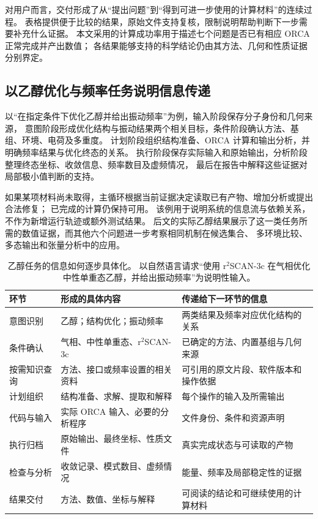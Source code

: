 \documentclass[UTF8,fontset=fandol,a4paper,11pt]{ctexart}
\begin{document}
对用户而言，交付形成了从“提出问题”到“得到可进一步使用的计算材料”的连续过程。%
表格提供便于比较的结果，原始文件支持复核，限制说明帮助判断下一步需要补充什么证据。%
本文采用的计算成功率用于描述七个问题是否已有相应 ORCA 正常完成并产出数值；%
各结果能够支持的科学结论仍由其方法、几何和性质证据分别界定。

\subsection{以乙醇优化与频率任务说明信息传递}
以“在指定条件下优化乙醇并给出振动频率”为例，输入阶段保存分子身份和几何来源，%
意图阶段形成优化结构与振动结果两个相关目标，条件阶段确认方法、基组、环境、电荷及多重度。%
计划阶段组织结构准备、ORCA 计算和输出分析，并明确频率结果与优化终态的关系。%
执行阶段保存实际输入和原始输出，分析阶段整理终态坐标、收敛信息、频率数目及虚频情况，%
最后在报告中解释这些证据对局部极小值判断的支持。

如果某项材料尚未取得，主循环根据当前证据决定读取已有产物、增加分析或提出合法修复；%
已完成的计算仍保持可用。%
该例用于说明系统的信息流与依赖关系，不作为新增运行轨迹或额外测试结果。%
后文的实际乙醇结果展示了这一类任务所需的数值证据，而其他六个问题进一步考察相同机制在候选集合、%
多环境比较、多态输出和张量分析中的应用。


\begin{table}[htbp]
  \centering\small
  \caption{乙醇任务的信息如何逐步具体化。%
  以自然语言请求“使用 r$^{2}$SCAN-3c 在气相优化中性单重态乙醇，并给出振动频率”为说明性输入。%
  }
  \label{tab:workflow-example}
  \begin{tabularx}{\linewidth}{p{2cm}YY}
    \toprule
    环节 & 形成的具体内容 & 传递给下一环节的信息\\
    \midrule
    意图识别 & 乙醇；结构优化；振动频率 & 两类结果及频率对应优化结构的关系\\
    条件确认 & 气相、中性单重态、r$^{2}$SCAN-3c & 已确定的方法、内置基组与几何来源\\
    按需知识查询 & 方法、接口或频率设置的相关资料 & 可引用的原文片段、软件版本和操作依据\\
    计划组织 & 结构准备、求解、提取和解释 & 每个操作的输入及所需输出\\
    代码与输入 & 实际 ORCA 输入、必要的分析程序 & 文件身份、条件和资源声明\\
    执行归档 & 原始输出、最终坐标、性质文件 & 真实完成状态与可读取的产物\\
    检查与分析 & 收敛记录、模式数目、虚频情况 & 能量、频率及局部稳定性的证据\\
    结果交付 & 方法、数值、坐标与解释 & 可阅读的结论和可继续使用的计算材料\\
    \bottomrule
  \end{tabularx}
\end{table}
\end{document}
